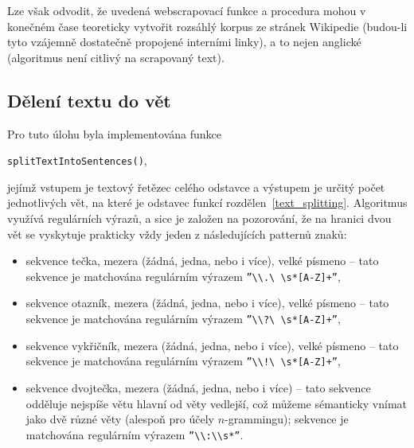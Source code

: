 Lze však odvodit, že uvedená webscrapovací funkce a procedura mohou v konečném
čase teoreticky vytvořit rozsáhlý korpus ze stránek Wikipedie (budou-li
tyto vzájemně dostatečně propojené interními linky), a to nejen anglické
(algoritmus není citlivý na scrapovaný text).


\subsection{Dělení textu do vět}

Pro tuto úlohu byla implementována funkce 

\begin{center}
\texttt{splitTextIntoSentences()},
\end{center}

jejímž vstupem je textový řetězec celého odstavce a výstupem je určitý počet
jednotlivých vět, na které je odstavec funkcí rozdělen~\ref{text_splitting}.
Algoritmus využívá regulárních výrazů,
a sice je založen na pozorování, že na
hranici dvou vět se vyskytuje prakticky vždy jeden z následujících patternů
znaků:

\begin{itemize}
  \item sekvence tečka, mezera (žádná, jedna, nebo i více), velké písmeno
  -- tato sekvence je matchována regulárním výrazem
  \texttt{''\textbackslash \textbackslash .\textbackslash
          \textbackslash s*[A-Z]+''},
  \item sekvence otazník, mezera (žádná, jedna, nebo i více), velké písmeno
  -- tato sekvence je matchována regulárním výrazem
  \texttt{''\textbackslash \textbackslash ?\textbackslash
          \textbackslash s*[A-Z]+''},
  \item sekvence vykřičník, mezera (žádná, jedna, nebo i více), velké písmeno
  -- tato sekvence je matchována regulárním výrazem
  \texttt{''\textbackslash \textbackslash !\textbackslash
          \textbackslash s*[A-Z]+''},
  \item sekvence dvojtečka, mezera (žádná, jedna, nebo i více)
  -- tato sekvence odděluje nejspíše větu hlavní od věty vedlejší,
  což můžeme sémanticky vnímat jako dvě různé věty (alespoň pro účely
  $n$-grammingu); sekvence je matchována regulárním výrazem%
  \texttt{''\textbackslash \textbackslash :\textbackslash \textbackslash s*''}.
\end{itemize}

